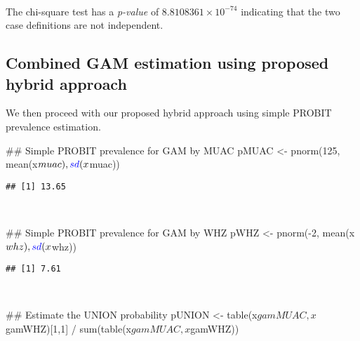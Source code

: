 \documentclass[12pt,a4paper]{article}
\newenvironment{Shaded}{}{}
\newcommand{\CommentTok}[1]{\textcolor[rgb]{0.00,0.50,0.00}{#1}}
\newcommand{\DecValTok}[1]{#1}
\newcommand{\KeywordTok}[1]{\textcolor[rgb]{0.00,0.00,1.00}{#1}}
\newcommand{\NormalTok}[1]{#1}
\newcommand{\OperatorTok}[1]{#1}
\newcommand{\StringTok}[1]{\textcolor[rgb]{0.00,0.50,0.50}{#1}}
\begin{document}
~

The chi-square test has a \emph{p-value} of \ensuremath{8.8108361\times 10^{-74}} indicating that the two case definitions are not independent.

\newpage

\hypertarget{combined-gam-estimation-using-proposed-hybrid-approach}{%
\subsection{Combined GAM estimation using proposed hybrid approach}\label{combined-gam-estimation-using-proposed-hybrid-approach}}

We then proceed with our proposed hybrid approach using simple PROBIT prevalence estimation.

\begin{Shaded}
\begin{Highlighting}[]
\CommentTok{## Simple PROBIT prevalence for GAM by MUAC}
\NormalTok{pMUAC <-}\StringTok{ }\KeywordTok{pnorm}\NormalTok{(}\DecValTok{125}\NormalTok{, }\KeywordTok{mean}\NormalTok{(x}\OperatorTok{$}\NormalTok{muac), }\KeywordTok{sd}\NormalTok{(x}\OperatorTok{$}\NormalTok{muac))}
\end{Highlighting}
\end{Shaded}

\begin{verbatim}
## [1] 13.65
\end{verbatim}

~

\begin{Shaded}
\begin{Highlighting}[]
\CommentTok{## Simple PROBIT prevalence for GAM by WHZ}
\NormalTok{pWHZ <-}\StringTok{ }\KeywordTok{pnorm}\NormalTok{(}\OperatorTok{-}\DecValTok{2}\NormalTok{, }\KeywordTok{mean}\NormalTok{(x}\OperatorTok{$}\NormalTok{whz), }\KeywordTok{sd}\NormalTok{(x}\OperatorTok{$}\NormalTok{whz))}
\end{Highlighting}
\end{Shaded}

\begin{verbatim}
## [1] 7.61
\end{verbatim}

~

\begin{Shaded}
\begin{Highlighting}[]
\CommentTok{## Estimate the UNION probability}
\NormalTok{pUNION <-}\StringTok{ }\KeywordTok{table}\NormalTok{(x}\OperatorTok{$}\NormalTok{gamMUAC, x}\OperatorTok{$}\NormalTok{gamWHZ)[}\DecValTok{1}\NormalTok{,}\DecValTok{1}\NormalTok{] }\OperatorTok{/}\StringTok{ }\KeywordTok{sum}\NormalTok{(}\KeywordTok{table}\NormalTok{(x}\OperatorTok{$}\NormalTok{gamMUAC, x}\OperatorTok{$}\NormalTok{gamWHZ))}
\end{Highlighting}
\end{Shaded}
\end{document}
